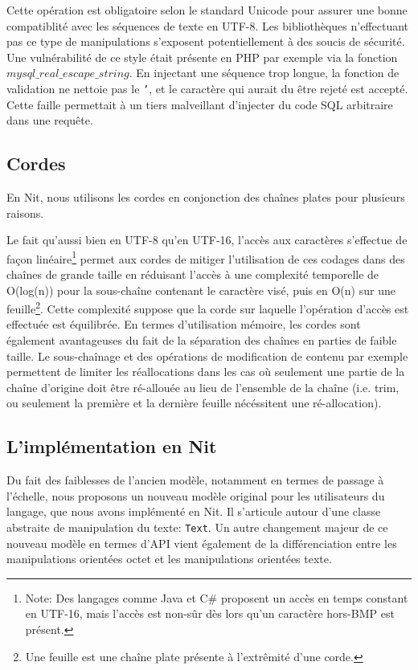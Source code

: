 Cette opération est obligatoire selon le standard Unicode pour assurer une bonne compatiblité
avec les séquences de texte en UTF-8.
Les bibliothèques n'effectuant pas ce type de manipulations s'exposent potentiellement à des soucis de sécurité.
Une vulnérabilité de ce style était présente en PHP par exemple via la fonction \texttt{$mysql\_real\_escape\_string$}.
En injectant une séquence trop longue, la fonction de validation ne nettoie pas le \texttt{'}, et
le caractère qui aurait du être rejeté est accepté.
Cette faille permettait à un tiers malveillant d'injecter du code SQL arbitraire dans une requête.

\subsection{Cordes}

En Nit, nous utilisons les cordes en conjonction des chaînes plates pour plusieurs
raisons.

Le fait qu'aussi bien en UTF-8 qu'en UTF-16, l'accès aux caractères s'effectue de façon linéaire\footnote{Note:
Des langages comme Java et C\# proposent un accès en temps constant en UTF-16, mais l'accès est
non-sûr dès lors qu'un caractère hors-BMP est présent.}
permet aux cordes de mitiger l'utilisation de ces codages dans des chaînes de grande taille en réduisant
l'accès à une complexité temporelle de O(log(n)) pour la sous-chaîne contenant le caractère visé,
puis en O(n) sur une feuille\footnote{Une feuille est une chaîne plate présente à l'extrêmité d'une corde.}.
Cette complexité suppose que la corde sur laquelle l'opération d'accès est effectuée est équilibrée.
En termes d'utilisation mémoire, les cordes sont également avantageuses du fait de la séparation des
chaînes en parties de faible taille.
Le sous-chaînage et des opérations de modification de contenu par exemple permettent de limiter les réallocations
dans les cas où seulement une partie de la chaîne d'origine doit être ré-allouée au lieu de l'ensemble de
la chaîne (i.e. trim, ou seulement la première et la dernière feuille nécéssitent une ré-allocation).

\subsection{L'implémentation en Nit}

Du fait des faiblesses de l'ancien modèle, notamment en termes de passage à l'échelle, nous
proposons un nouveau modèle original pour les utilisateurs du langage, que nous avons
implémenté en Nit.
Il s'articule autour d'une classe abstraite de manipulation du texte: \texttt{Text}.
Un autre changement majeur de ce nouveau modèle en termes d'API vient également de la différenciation
entre les manipulations orientées octet et les manipulations orientées texte.

